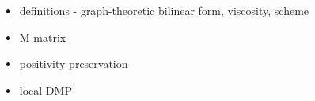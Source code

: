 \begin{itemize}
  \item definitions - graph-theoretic bilinear form, viscosity, scheme
  \item M-matrix
  \item positivity preservation
  \item local DMP
\end{itemize}
